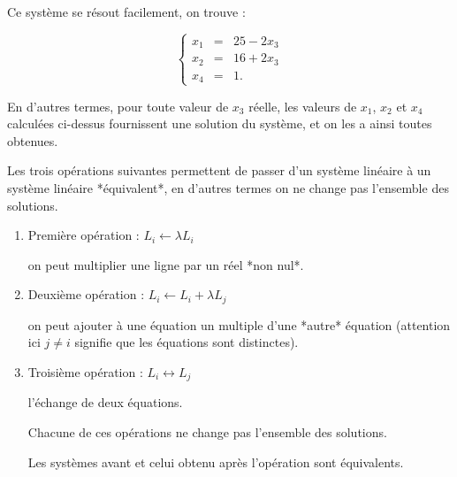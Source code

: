 \change

Ce système se résout facilement, on trouve :

$$\left\{\begin{array}{ccc}
x_1&=&25-2x_3\\
x_2&=&16+2x_3\\
x_4&=&1.
\end{array}\right.
$$

\change



En d'autres termes, pour toute valeur de $x_3$ réelle, 
les valeurs de $x_1$, $x_2$ et $x_4$ calculées ci-dessus fournissent 
une solution du système, et on les a ainsi toutes obtenues. 

\diapo

Les trois opérations suivantes permettent de passer d'un système linéaire
à un système linéaire %
*équivalent*, en d'autres termes on ne change pas l'ensemble des solutions.

\change

\begin{enumerate}
	\item Première opération : $L_i \leftarrow \lambda L_i$ 
	
	\change
	
	on peut multiplier une ligne par un réel *non nul*.
	
\change

	\item Deuxième opération : $L_i \leftarrow L_i+\lambda L_j$
	
	
	\change
	
	on peut ajouter à une équation un multiple d'une *autre* équation (attention ici $j\neq i$ signifie que les équations sont distinctes).
	
\change

	\item Troisième opération : $L_i \leftrightarrow L_j$
	
	\change
	
	l'échange de deux équations.
	
\change

Chacune de ces opérations ne change pas l'ensemble des solutions.

Les systèmes avant et celui obtenu après l'opération sont équivalents.

\end{enumerate}


\diapo

